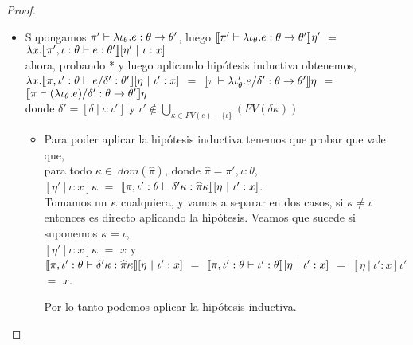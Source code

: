 \begin{proof}
\begin{itemize}
\begin{itemize}
\item Supongamos $\pi' \vdash \lambda \iota_{\theta} . e : \theta \rightarrow \theta'$, luego
$\llbracket \pi' \vdash \lambda \iota_{\theta} . e : \theta \rightarrow \theta' \rrbracket\eta'$ $=$
$\lambda x . \llbracket \pi',\iota:\theta \vdash e : \theta' \rrbracket[ \eta' \ | \ \iota:x ]$ \\

ahora, probando * y luego aplicando hip\'otesis inductiva obtenemos,\\

$\lambda x . \llbracket \pi,\iota':\theta \vdash e / \delta' : \theta' \rrbracket[ \eta \ | \ \iota':x ]$ $=$
$\llbracket \pi \vdash \lambda \iota'_{\theta} . e / \delta' : \theta \rightarrow \theta' \rrbracket\eta$ $=$
$\llbracket \pi \vdash (\lambda \iota_{\theta} . e) / \delta' : \theta \rightarrow \theta' \rrbracket\eta$\\

donde $\delta' = [ \delta \ | \ \iota:\iota' ]$ y 
$\iota' \not\in \bigcup\limits_{\kappa \in FV(e)-\{\iota\}} (FV(\delta\kappa))$

\begin{itemize}
\item Para poder aplicar la hip\'otesis inductiva tenemos que probar que vale que,\\

para todo $\kappa \in \ dom (\widehat{\pi})$, donde $\widehat{\pi} = \pi',\iota:\theta$, \\

$[ \eta' \ | \ \iota:x ]\kappa$ $=$ 
$\llbracket \pi,\iota':\theta \vdash \delta'\kappa : \widehat{\pi}\kappa \rrbracket[ \eta \ | \ \iota':x ]$.\\

Tomamos un $\kappa$ cualquiera, y vamos a separar en dos casos, si $\kappa \not= \iota$ entonces
es directo aplicando la hip\'otesis. Veamos que sucede si suponemos $\kappa = \iota$,\\

$[ \eta' \ | \ \iota:x ]\kappa$ $=$ $x$ y\\

$\llbracket \pi,\iota':\theta \vdash \delta'\kappa : \widehat{\pi}\kappa \rrbracket[ \eta \ | \ \iota':x ]$ $=$
$\llbracket \pi,\iota':\theta \vdash \iota' : \theta \rrbracket[ \eta \ | \ \iota':x ]$ $=$
$[ \eta \ | \ \iota':x ]\iota'$ $=$ $x$.

Por lo tanto podemos aplicar la hip\'otesis inductiva.\\

\end{itemize}
\end{itemize}
\end{itemize}
\end{proof}

